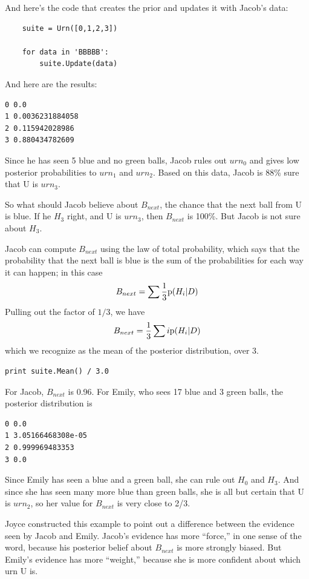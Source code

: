 \documentclass[12pt]{book}
\begin{document}
And here's the code that creates the prior and updates it
with Jacob's data:

\begin{verbatim}
    suite = Urn([0,1,2,3])

    for data in 'BBBBB':
        suite.Update(data)
\end{verbatim}

And here are the results:

\begin{verbatim}
0 0.0
1 0.0036231884058
2 0.115942028986
3 0.880434782609
\end{verbatim}

Since he has seen 5 blue and no green balls, Jacob rules out $urn_0$
and gives low posterior probabilities to $urn_1$ and $urn_2$.  Based
on this data, Jacob is 88\% sure that U is $urn_3$.

So what should Jacob believe about $B_{next}$, the chance that the
next ball from U is blue.  If he $H_3$ right, and U is $urn_3$,
then $B_{next}$ is 100\%.  But Jacob is not sure about $H_3$.

Jacob can compute $B_{next}$ using the law of total probability, which
says that the probability that the next ball is blue is the sum
of the probabilities for each way it can happen; in this case
%
\[ B_{next} = \sum \frac{1}{3} \mathrm{p}(H_i | D) \]
%
Pulling out the factor of $1/3$, we have
%
\[ B_{next} = \frac{1}{3} \sum i \mathrm{p}(H_i | D) \]
%
which we recognize as the mean of the posterior distribution, over 3.

\begin{verbatim}
print suite.Mean() / 3.0
\end{verbatim}

For Jacob, $B_{next}$ is 0.96.  For Emily, who sees 17 blue and 3 green
balls, the posterior distribution is 

\begin{verbatim}
0 0.0
1 3.05166468308e-05
2 0.999969483353
3 0.0
\end{verbatim}

Since Emily has seen a blue and a green ball, she can rule out $H_0$
and $H_3$.  And since she has seen many more blue than green balls,
she is all but certain that U is $urn_2$, so her value for $B_{next}$
is very close to 2/3.

Joyce constructed this example to point out a difference between the
evidence seen by Jacob and Emily.  Jacob's evidence has more
``force,'' in one sense of the word, because his posterior belief
about $B_{next}$ is more strongly biased.  But Emily's evidence has
more ``weight,'' because she is more confident about which urn U is.
\end{document}
